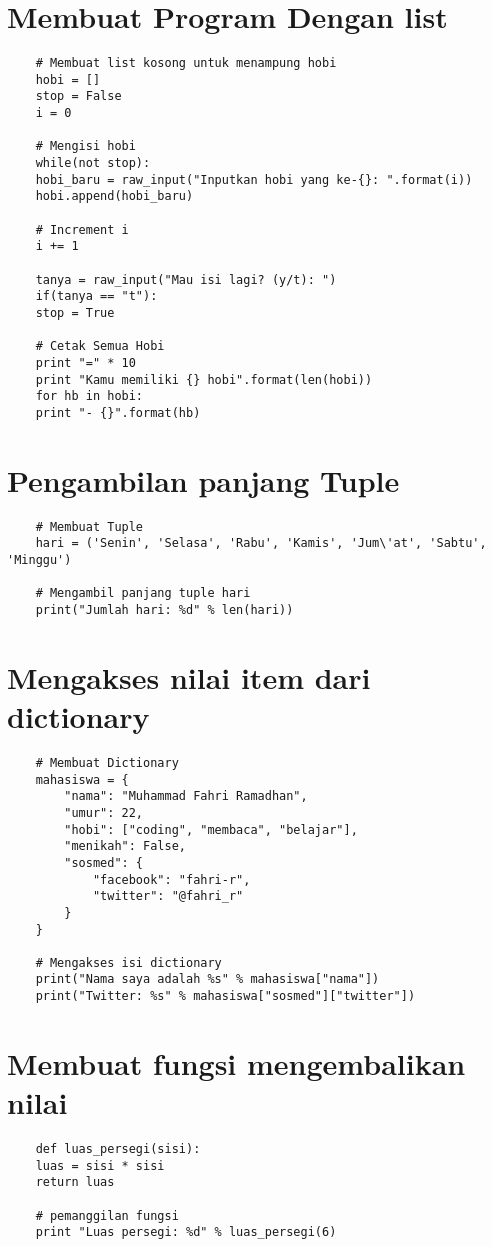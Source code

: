 \documentclass{article}
\begin{document}
\section{Membuat Program Dengan list}
\begin{lstlisting}
	# Membuat list kosong untuk menampung hobi
	hobi = []
	stop = False
	i = 0
	
	# Mengisi hobi
	while(not stop):
	hobi_baru = raw_input("Inputkan hobi yang ke-{}: ".format(i))
	hobi.append(hobi_baru)
	
	# Increment i
	i += 1
	
	tanya = raw_input("Mau isi lagi? (y/t): ")
	if(tanya == "t"): 
	stop = True
	
	# Cetak Semua Hobi
	print "=" * 10 
	print "Kamu memiliki {} hobi".format(len(hobi))
	for hb in hobi:
	print "- {}".format(hb)
\end{lstlisting}

\section{Pengambilan panjang Tuple}
\begin{lstlisting}
	# Membuat Tuple
	hari = ('Senin', 'Selasa', 'Rabu', 'Kamis', 'Jum\'at', 'Sabtu', 'Minggu')
	
	# Mengambil panjang tuple hari
	print("Jumlah hari: %d" % len(hari))
\end{lstlisting}

\section{Mengakses nilai item dari dictionary}
\begin{lstlisting}
	# Membuat Dictionary
	mahasiswa = {
		"nama": "Muhammad Fahri Ramadhan",
		"umur": 22,
		"hobi": ["coding", "membaca", "belajar"],
		"menikah": False,
		"sosmed": {
			"facebook": "fahri-r",
			"twitter": "@fahri_r"
		} 
	}
	
	# Mengakses isi dictionary
	print("Nama saya adalah %s" % mahasiswa["nama"])
	print("Twitter: %s" % mahasiswa["sosmed"]["twitter"])
\end{lstlisting}

\section{Membuat fungsi mengembalikan nilai}
\begin{lstlisting}
	def luas_persegi(sisi):
	luas = sisi * sisi
	return luas
	
	# pemanggilan fungsi
	print "Luas persegi: %d" % luas_persegi(6)
\end{lstlisting}
\end{document}
